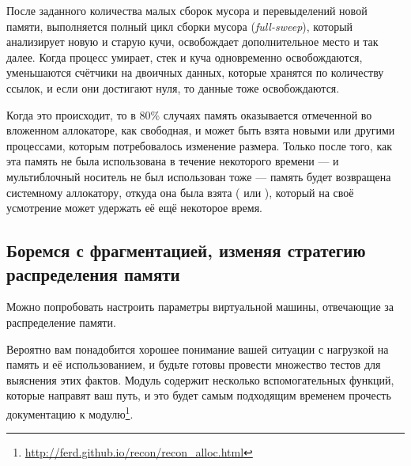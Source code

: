 После заданного количества малых сборок мусора и перевыделений новой памяти, выполняется полный цикл сборки мусора (\emph{full-sweep}), который анализирует новую и старую кучи, освобождает дополнительное место и так далее. Когда процесс умирает, стек и куча одновременно освобождаются, уменьшаются счётчики на двоичных данных, которые хранятся по количеству ссылок, и если они достигают нуля, то данные тоже освобождаются.

Когда это происходит, то в 80\% случаях память оказывается отмеченной во вложенном аллокаторе, как свободная, и может быть взята новыми или другими процессами, которым потребовалось изменение размера. Только после того, как эта память не была использована в течение некоторого времени --- и мультиблочный носитель не был использован тоже --- память будет возвращена системному аллокатору, откуда она была взята ( или ), который на своё усмотрение может удержать её ещё некоторое время.


\subsection{Боремся с фрагментацией, изменяя стратегию распределения памяти}

Можно попробовать настроить параметры виртуальной машины, отвечающие за распределение памяти.

Вероятно вам понадобится хорошее понимание вашей ситуации с нагрузкой на память и её использованием, и будьте готовы провести множество тестов для выяснения этих фактов. Модуль  содержит несколько вспомогательных функций, которые направят ваш путь, и это будет самым подходящим временем прочесть документацию к модулю\footnote{\href{http://ferd.github.io/recon/recon\_alloc.html}{http://ferd.github.io/recon/recon\_alloc.html}}.


